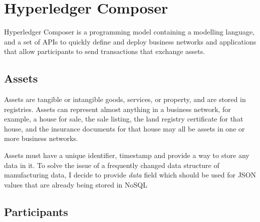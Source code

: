 \section{Hyperledger Composer}

Hyperledger Composer is a programming model containing a modelling language, and a set of APIs to quickly define and deploy business networks and applications that allow participants to send transactions that exchange assets.



\subsection{Assets}
Assets are tangible or intangible goods, services, or property, and are stored in registries. Assets can represent almost anything in a business network, for example, a house for sale, the sale listing, the land registry certificate for that house, and the insurance documents for that house may all be assets in one or more business networks.

Assets must have a unique identifier, timestamp and provide a way to store any data in it. To solve the issue of a frequently changed data structure of manufacturing data, I decide to provide \emph{data} field which should be used for JSON values that are already being stored in NoSQL

\subsection{Participants}

